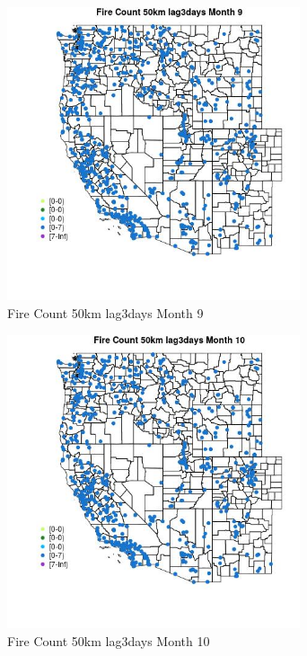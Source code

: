 \begin{figure} 
\centering  
\includegraphics[width=0.77\textwidth]{Code_Outputs/Report_ML_input_PM25_Step4_part_e_de_duplicated_aves_compiled_2019-05-21wNAs_MapObsMo9Fire_Count_50km_lag3days.jpg} 
\caption{\label{fig:Report_ML_input_PM25_Step4_part_e_de_duplicated_aves_compiled_2019-05-21wNAsMapObsMo9Fire_Count_50km_lag3days}Fire Count 50km lag3days Month 9} 
\end{figure} 
 

\begin{figure} 
\centering  
\includegraphics[width=0.77\textwidth]{Code_Outputs/Report_ML_input_PM25_Step4_part_e_de_duplicated_aves_compiled_2019-05-21wNAs_MapObsMo10Fire_Count_50km_lag3days.jpg} 
\caption{\label{fig:Report_ML_input_PM25_Step4_part_e_de_duplicated_aves_compiled_2019-05-21wNAsMapObsMo10Fire_Count_50km_lag3days}Fire Count 50km lag3days Month 10} 
\end{figure} 
 

